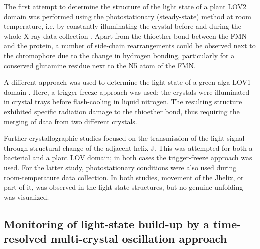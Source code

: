 The first attempt to determine the structure of the light state of a plant LOV2 domain was performed using the photostationary (steady-state) method at room temperature, i.e. by constantly illuminating the crystal before and during the whole X-ray data collection \parencite{crossonPhotoexcitedStructurePlant2002}. Apart from the thioether bond between the FMN and the protein, a number of side-chain rearrangements could be observed next to the chromophore due to the change in hydrogen bonding, particularly for a conserved glutamine residue next to the N5 atom of the FMN. 

A different approach was used to determine the light state of a green alga LOV1 domain \parencite{fedorovCrystalStructuresMolecular2003}. Here, a trigger-freeze approach was used: the crystals were illuminated in crystal trays before flash-cooling in liquid nitrogen. The resulting structure exhibited specific radiation damage to the thioether bond, thus requiring the merging of data from two different crystals. 

Further crystallographic studies focused on the transmission of the light signal through structural change of the adjacent helix J\textalpha . This was attempted for both a bacterial \parencite{moglichStructuralBasisLightdependent2007} and a plant \parencite{halavatyCTerminalFlankingRegions2007} LOV domain; in both cases the trigger-freeze approach was used. For the latter study, photostationary conditions were also used during room-temperature data collection. In both studies, movement of the J\textalpha helix, or part of it, was observed in the light-state structures, but no genuine unfolding was visualized.

\subsection{Monitoring of light-state build-up by a time-resolved multi-crystal oscillation approach}\label{sec:LOV2_TR-SOX}

